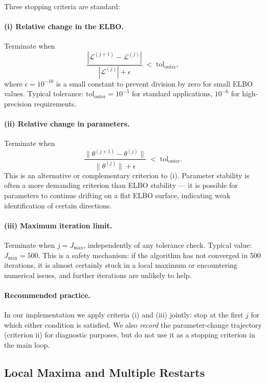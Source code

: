 \documentclass[11pt, a4paper, oneside]{article}
\begin{document}
Three stopping criteria are standard:

\paragraph{(i) Relative change in the ELBO.}
Terminate when
\[
\frac{|\mathcal{L}^{(j+1)} - \mathcal{L}^{(j)}|}{|\mathcal{L}^{(j)}| + \epsilon} \;<\; \mathrm{tol}_{\text{outer}},
\]
where $\epsilon = 10^{-10}$ is a small constant to prevent division
by zero for small ELBO values. Typical tolerance:
$\mathrm{tol}_{\text{outer}} = 10^{-5}$ for standard applications,
$10^{-6}$ for high-precision requirements.

\paragraph{(ii) Relative change in parameters.}
Terminate when
\[
\frac{\|\theta^{(j+1)} - \theta^{(j)}\|}{\|\theta^{(j)}\| + \epsilon} \;<\; \mathrm{tol}_{\text{outer}}.
\]
This is an alternative or complementary criterion to (i). Parameter
stability is often a more demanding criterion than ELBO stability —
it is possible for parameters to continue drifting on a flat ELBO
surface, indicating weak identification of certain directions.

\paragraph{(iii) Maximum iteration limit.}
Terminate when $j = J_{\max}$, independently of any tolerance check.
Typical value: $J_{\max} = 500$. This is a safety mechanism: if the
algorithm has not converged in 500 iterations, it is almost certainly
stuck in a local maximum or encountering numerical issues, and
further iterations are unlikely to help.

\paragraph{Recommended practice.}
In our implementation we apply criteria (i) and (iii) jointly: stop
at the first $j$ for which either condition is satisfied. We also
\emph{record} the parameter-change trajectory (criterion ii) for
diagnostic purposes, but do not use it as a stopping criterion in
the main loop.

\subsection{Local Maxima and Multiple Restarts}
\label{subsec:local-maxima}
\end{document}
